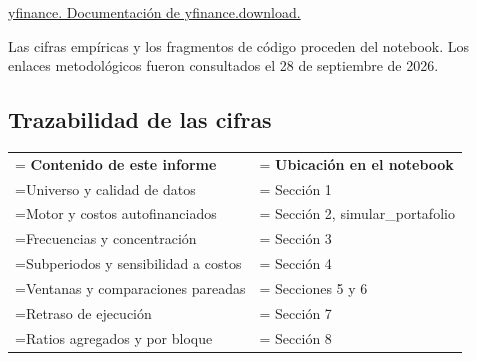 \documentclass[11pt,letterpaper]{article}
\begin{document}
{\small\RaggedRight [6] \href{https://ranaroussi.github.io/yfinance/reference/api/yfinance.download.html}{yfinance. Documentación de yfinance.download.}\par}

{\small Las cifras empíricas y los fragmentos de código proceden del notebook. Los enlaces metodológicos fueron consultados el 28 de septiembre de 2026.\par}

\subsection*{Trazabilidad de las cifras}

\begingroup
\fontsize{10}{12.0}\selectfont


\noindent\begin{tabularx}{\linewidth}{>{\hsize=1.008646\hsize\linewidth=\hsize\RaggedRight\arraybackslash}X>{\hsize=0.991354\hsize\linewidth=\hsize\Centering\arraybackslash}X}

\rowcolor{azul} \color{white}\bfseries Contenido de este informe & \color{white}\bfseries Ubicación en el notebook \\

Universo y calidad de datos & Sección 1 \\

Motor y costos autofinanciados & Sección 2, simular\_portafolio \\

Frecuencias y concentración & Sección 3 \\

Subperiodos y sensibilidad a costos & Sección 4 \\

Ventanas y comparaciones pareadas & Secciones 5 y 6 \\

Retraso de ejecución & Sección 7 \\

Ratios agregados y por bloque & Sección 8 \\

\end{tabularx}\par\endgroup
\vspace{4pt}
\end{document}
